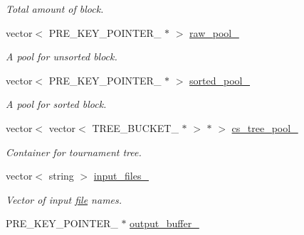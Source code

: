 \begin{CompactItemize}
\begin{CompactList}\small\item\em Total amount of block. \item\end{CompactList}\item 
\hypertarget{classAlphaSort_aada64eb92a126132ab630bb0a5e6a44}{
vector$<$ PRE\_\-KEY\_\-POINTER\_\- $\ast$ $>$ \hyperlink{classAlphaSort_aada64eb92a126132ab630bb0a5e6a44}{raw\_\-pool\_\-}}
\label{classAlphaSort_aada64eb92a126132ab630bb0a5e6a44}

\begin{CompactList}\small\item\em A pool for unsorted block. \item\end{CompactList}\item 
\hypertarget{classAlphaSort_7d105ab8a344ef94d64df1b8e37c77e6}{
vector$<$ PRE\_\-KEY\_\-POINTER\_\- $\ast$ $>$ \hyperlink{classAlphaSort_7d105ab8a344ef94d64df1b8e37c77e6}{sorted\_\-pool\_\-}}
\label{classAlphaSort_7d105ab8a344ef94d64df1b8e37c77e6}

\begin{CompactList}\small\item\em A pool for sorted block. \item\end{CompactList}\item 
\hypertarget{classAlphaSort_6014b08bcfb4395e514ea6f20aa2e643}{
vector$<$ vector$<$ TREE\_\-BUCKET\_\- $\ast$ $>$ $\ast$ $>$ \hyperlink{classAlphaSort_6014b08bcfb4395e514ea6f20aa2e643}{cs\_\-tree\_\-pool\_\-}}
\label{classAlphaSort_6014b08bcfb4395e514ea6f20aa2e643}

\begin{CompactList}\small\item\em Container for tournament tree. \item\end{CompactList}\item 
\hypertarget{classAlphaSort_a4e5668677e5b94dd487f663aa66b22f}{
vector$<$ string $>$ \hyperlink{classAlphaSort_a4e5668677e5b94dd487f663aa66b22f}{input\_\-files\_\-}}
\label{classAlphaSort_a4e5668677e5b94dd487f663aa66b22f}

\begin{CompactList}\small\item\em Vector of input \hyperlink{classfile}{file} names. \item\end{CompactList}\item 
\hypertarget{classAlphaSort_cfa856dbf2f4252d33f3c131aea6b0ea}{
PRE\_\-KEY\_\-POINTER\_\- $\ast$ \hyperlink{classAlphaSort_cfa856dbf2f4252d33f3c131aea6b0ea}{output\_\-buffer\_\-}}
\label{classAlphaSort_cfa856dbf2f4252d33f3c131aea6b0ea}


\end{CompactItemize}
